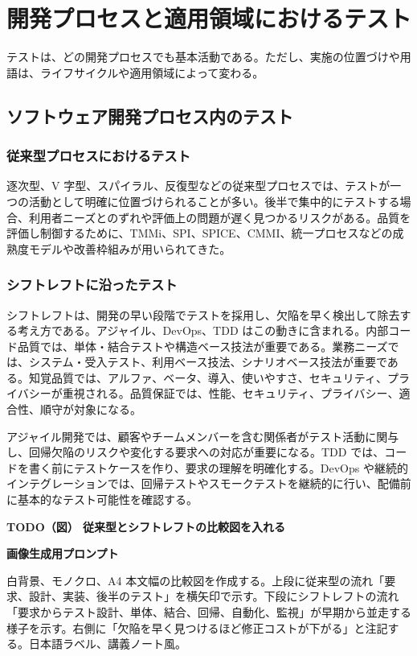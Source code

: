 \documentclass[uplatex,dvipdfmx,a4paper,11pt,nomag]{jsarticle}
\newenvironment{todobox}[2]{\par\medskip\begin{framed}\noindent\textbf{TODO（図） #1}\par\smallskip\noindent\textbf{画像生成用プロンプト}\par\smallskip\noindent #2\par\smallskip}{\end{framed}\par\medskip}
\begin{document}
\section{開発プロセスと適用領域におけるテスト}
テストは、どの開発プロセスでも基本活動である。ただし、実施の位置づけや用語は、ライフサイクルや適用領域によって変わる。

\subsection{ソフトウェア開発プロセス内のテスト}
\subsubsection{従来型プロセスにおけるテスト}
逐次型、V 字型、スパイラル、反復型などの従来型プロセスでは、テストが一つの活動として明確に位置づけられることが多い。後半で集中的にテストする場合、利用者ニーズとのずれや評価上の問題が遅く見つかるリスクがある。品質を評価し制御するために、TMMi、SPI、SPICE、CMMI、統一プロセスなどの成熟度モデルや改善枠組みが用いられてきた。

\subsubsection{シフトレフトに沿ったテスト}
シフトレフトは、開発の早い段階でテストを採用し、欠陥を早く検出して除去する考え方である。アジャイル、DevOps、TDD はこの動きに含まれる。内部コード品質では、単体・結合テストや構造ベース技法が重要である。業務ニーズでは、システム・受入テスト、利用ベース技法、シナリオベース技法が重要である。知覚品質では、アルファ、ベータ、導入、使いやすさ、セキュリティ、プライバシーが重視される。品質保証では、性能、セキュリティ、プライバシー、適合性、順守が対象になる。

アジャイル開発では、顧客やチームメンバーを含む関係者がテスト活動に関与し、回帰欠陥のリスクや変化する要求への対応が重要になる。TDD では、コードを書く前にテストケースを作り、要求の理解を明確化する。DevOps や継続的インテグレーションでは、回帰テストやスモークテストを継続的に行い、配備前に基本的なテスト可能性を確認する。

\begin{todobox}{従来型とシフトレフトの比較図を入れる}{白背景、モノクロ、A4 本文幅の比較図を作成する。上段に従来型の流れ「要求、設計、実装、後半のテスト」を横矢印で示す。下段にシフトレフトの流れ「要求からテスト設計、単体、結合、回帰、自動化、監視」が早期から並走する様子を示す。右側に「欠陥を早く見つけるほど修正コストが下がる」と注記する。日本語ラベル、講義ノート風。}
\end{todobox}
\end{document}
